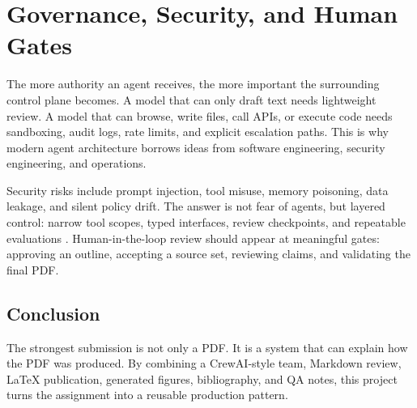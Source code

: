 \chapter{Governance, Security, and Human Gates}
The more authority an agent receives, the more important the surrounding control plane becomes. A model that can only draft text needs lightweight review. A model that can browse, write files, call APIs, or execute code needs sandboxing, audit logs, rate limits, and explicit escalation paths. This is why modern agent architecture borrows ideas from software engineering, security engineering, and operations.

Security risks include prompt injection, tool misuse, memory poisoning, data leakage, and silent policy drift. The answer is not fear of agents, but layered control: narrow tool scopes, typed interfaces, review checkpoints, and repeatable evaluations \cite{owasp2025agents}. Human-in-the-loop review should appear at meaningful gates: approving an outline, accepting a source set, reviewing claims, and validating the final PDF.

\section{Conclusion}
The strongest submission is not only a PDF. It is a system that can explain how the PDF was produced. By combining a CrewAI-style team, Markdown review, LaTeX publication, generated figures, bibliography, and QA notes, this project turns the assignment into a reusable production pattern.
